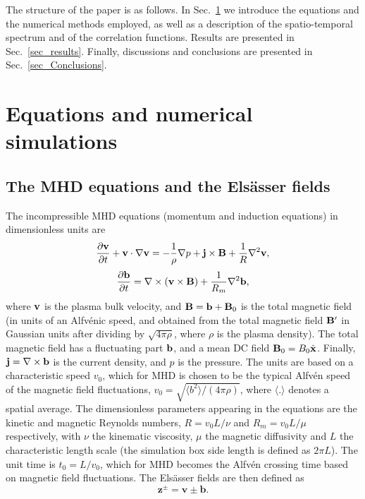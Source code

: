 \documentclass[aip,pop,reprint,amsmath,amssymb,floatfix]{revtex4-1}
\let\oldhat\hat
\renewcommand{\vec}[1]{\mathbf{#1}}
\renewcommand{\hat}[1]{\oldhat{\mathbf{#1}}}
\begin{document}
The structure of the paper is as follows. In Sec.~\ref{sec_EqNumSim} we introduce the equations and the numerical methods employed, as well as a description of the spatio-temporal spectrum and of the correlation functions. Results are presented in Sec.~\ref{sec_results}. Finally, discussions and conclusions are presented in Sec.~\ref{sec_Conclusions}. 

\section{Equations and numerical simulations}\label{sec_EqNumSim}

\subsection{The MHD equations and the Els\"asser fields}\label{sec_eq}
The incompressible MHD equations (momentum and induction equations) in dimensionless units are
\begin{equation}\label{eq:MHD_v}
  \frac {\partial {\bf v}}{\partial t} +
  {\bf v }\cdot \nabla {\bf v} = -\frac{1}{\rho}\nabla p +
  {\bf j} \times {\bf B} + \frac{1}{R} \nabla^2{\bf v},
\end{equation}
\begin{equation}\label{eq:MHD_b}
  \frac{\partial {\bf b}}{\partial t} = \nabla \times ({\bf v} 
  \times {\bf B}) + \frac{1}{R_m} \nabla^2 {\bf b},
\end{equation}
where ${\bf v}$ is the plasma bulk velocity, and ${\bf B} = {\bf b} + {\bf B}_0$ is the total magnetic field (in units of an Alfv\'enic speed, and obtained from the total magnetic field ${\bf B}'$ in Gaussian units after dividing by $\sqrt{4\pi\rho}$, where $\rho$ is the plasma density). The total magnetic field has a fluctuating part ${\bf b}$, and a mean DC field ${\bf B}_0=B_0\hat{x}$. Finally, ${\bf j} = \nabla \times {\bf b}$ is the current density, and $p$ is the pressure. The units are based on a characteristic speed $v_0$, which for MHD is chosen to be the typical Alfv\'en speed of the magnetic field fluctuations, $v_0 = \sqrt{\langle b^2 \rangle /(4\pi\rho)}$, where $\langle . \rangle$ denotes a spatial average. The dimensionless parameters appearing in the equations are the kinetic and magnetic Reynolds numbers, $R=v_0 L/\nu$ and $R_m = v_0 L /\mu$ respectively, with $\nu$ the kinematic viscosity, $\mu$ the magnetic diffusivity and $L$ the characteristic length scale (the simulation box side length is defined as $2\pi L$). The unit time is $t_0 = L/v_0$, which for MHD becomes the Alfv\'en crossing time based on magnetic field fluctuations. The Els\"asser fields are then defined as
\begin{equation}\label{eq:MHD_zdef}
\vec{z}^\pm = \vec{v} \pm \vec{b} .
\end{equation}
\end{document}
